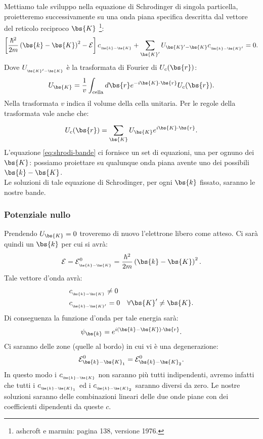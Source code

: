 Mettiamo tale sviluppo nella equazione di Schrodinger di singola particella, proietteremo successivamente su una onda piana specifica descritta dal vettore del reticolo reciproco $\bs{K}$ \footnote{ashcroft e marmin: pagina 138, versione 1976.}:
\[
	\left[ \frac{\hbar ^2}{2m}\left( \bs{k}-\bs{K} \right)^2 - \mathcal{E} \right] 
	c_{_{\bs{k}-\bs{K}}}+
	\sum_{\bs{K}'}^{} U_{\bs{K}'-\bs{K}}c_{_{\bs{k}-\bs{K}'}} = 0
	\label{eq:shrodi-bande}
.\] 
Dove $U_{_{\bs{K}'-\bs{K}}}$ è la trasformata di Fourier di $U_{c}(\bs{r})$:
\[
	U_{\bs{K}} 
	= 
	\frac{1}{v}
	\int_{\text{cella}} d \bs{r} 
	e^{-i\bs{K}\cdot\bs{r}} U_c(\bs{r})
.\] 
Nella trasformata $v$ indica il volume della cella unitaria. Per le regole della trasformata vale anche che:
\[
	U_c(\bs{r}) = \sum_{\bs{K}}^{} U_{\bs{K}}e^{i\bs{K}\cdot\bs{r}}
.\] 
L'equazione \ref{eq:shrodi-bande} ci fornisce un set di equazioni, una per ognuno dei $\bs{K}$: possiamo proiettare su qualunque onda piana avente uno dei possibili $\bs{k}-\bs{K}$.\\
Le soluzioni di tale equazione di Schrodinger, per ogni $\bs{k}$ fissato, saranno le nostre bande. 
\subsubsection{Potenziale nullo}
\label{subsubsec:Potenziale nullo}
Prendendo $U_{\bs{K}} = 0$ troveremo di nuovo l'elettrone libero come atteso. Ci sarà quindi un $\bs{k}$ per cui si avrà:
\[
	\mathcal{E}  
	=
	\mathcal{E}^0_{_{\bs{k}-\bs{K}}} 
	=
	\frac{\hbar^2}{2m}\left( \bs{k}-\bs{K} \right)^2
.\] 
Tale vettore d'onda avrà:
\[\begin{aligned}
	&c_{_{\bs{k}-\bs{K}}}\neq 0 \\
	& c_{_{\bs{k}-\bs{K}'}} = 0 \quad \forall \bs{K}' \neq \bs{K}
.\end{aligned}\]
Di conseguenza la funzione d'onda per tale energia sarà:
\[
	\psi_{\bs{k}}=e^{i\left( \bs{k}-\bs{K} \right) \cdot\bs{r}}
.\] 
Ci saranno delle zone (quelle al bordo) in cui vi è una degenerazione:
\[
	\mathcal{E}^0_{\bs{k}-\bs{K}_1} = \mathcal{E}^0_{\bs{k}-\bs{K}_2}
.\] 
In questo modo i $c_{_{\bs{k}-\bs{K}}}$ non saranno più tutti indipendenti, avremo infatti che tutti i $c_{_{\bs{k}-\bs{K}_1}}$ ed i $c_{_{\bs{k}-\bs{K}_2}}$ saranno diversi da zero. Le nostre soluzioni saranno delle combinazioni lineari delle due onde piane con dei coefficienti dipendenti da queste $c$. 
